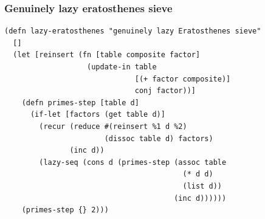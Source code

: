 \documentclass{beamer}
\begin{document}
\begin{frame}[fragile]
\frametitle{Genuinely lazy eratosthenes sieve}
\begin{verbatim}
(defn lazy-eratosthenes "genuinely lazy Eratosthenes sieve"
  []
  (let [reinsert (fn [table composite factor]
                   (update-in table
                              [(+ factor composite)]
                              conj factor))]
    (defn primes-step [table d]
      (if-let [factors (get table d)]
        (recur (reduce #(reinsert %1 d %2)
                       (dissoc table d) factors)
               (inc d))
        (lazy-seq (cons d (primes-step (assoc table
                                         (* d d)
                                         (list d))
                                       (inc d))))))
    (primes-step {} 2)))
\end{verbatim}
\end{frame}
\end{document}
